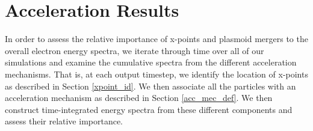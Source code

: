 \documentclass[iop,twocolappendix]{emulateapj}
\begin{document}




\section{Acceleration Results}
In order to assess the relative importance of x-points and plasmoid mergers to the overall electron energy spectra, we iterate through time over all of our simulations and examine the cumulative spectra from the different acceleration mechanisms.  That is, at each output timestep, we identify the location of x-points as described in Section \ref{xpoint_id}.  We then associate all the particles with an acceleration mechanism as described in Section \ref{acc_mec_def}.  We then construct time-integrated energy spectra from these different components and assess their relative importance.  %
\end{document}
